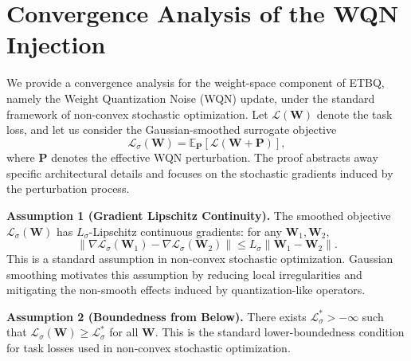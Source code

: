 \documentclass{article}
\begin{document}



\clearpage
\onecolumn

\appendix

\section{Convergence Analysis of the WQN Injection}
\label{app:proof}

We provide a convergence analysis for the weight-space component of ETBQ, namely the Weight Quantization Noise (WQN) update, under the standard framework of non-convex stochastic optimization. Let $\mathcal{L}(\boldsymbol{W})$ denote the task loss, and let us consider the Gaussian-smoothed surrogate objective
\begin{equation}
    \mathcal{L}_\sigma(\boldsymbol{W})=\mathbb{E}_{\boldsymbol{P}}[\mathcal{L}(\boldsymbol{W}+\boldsymbol{P})],
\end{equation}
where $\boldsymbol{P}$ denotes the effective WQN perturbation. The proof abstracts away specific architectural details and focuses on the stochastic gradients induced by the perturbation process.

\textbf{Assumption 1 (Gradient Lipschitz Continuity).}
The smoothed objective $\mathcal{L}_\sigma(\boldsymbol{W})$ has $L_\sigma$-Lipschitz continuous gradients: for any $\boldsymbol{W}_1,\boldsymbol{W}_2$,
\begin{equation}
    \|\nabla \mathcal{L}_\sigma(\boldsymbol{W}_1) - \nabla \mathcal{L}_\sigma(\boldsymbol{W}_2)\| \leq L_\sigma \|\boldsymbol{W}_1 - \boldsymbol{W}_2\|.
\end{equation}
This is a standard assumption in non-convex stochastic optimization. Gaussian smoothing motivates this assumption by reducing local irregularities and mitigating the non-smooth effects induced by quantization-like operators.

\textbf{Assumption 2 (Boundedness from Below).}
There exists $\mathcal{L}_\sigma^* > -\infty$ such that $\mathcal{L}_\sigma(\boldsymbol{W}) \geq \mathcal{L}_\sigma^*$ for all $\boldsymbol{W}$. This is the standard lower-boundedness condition for task losses used in non-convex stochastic optimization.
\end{document}
